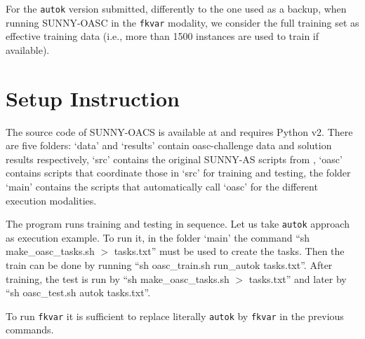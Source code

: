 \documentclass[tablecaption=bottom,wcp]{jmlr} %
\begin{document}
For the \texttt{autok} version submitted, differently to the one used as a 
backup, when running SUNNY-OASC in the \texttt{fkvar} modality, we consider the 
full training set as effective training data (i.e., more than 1500 
instances are used to train if available). 

\section{Setup Instruction}

The source code of SUNNY-OACS is available at \cite{sunnyoasc} and requires 
Python v2. There are five folders: `data' and `results' contain oasc-challenge 
data and solution results respectively, `src' contains the original SUNNY-AS 
scripts from \cite{sunnyas}, `oasc' contains scripts that coordinate those in 
`src' for training and testing, the folder `main' contains the scripts that 
automatically call `oasc' for the different execution modalities. 

The program runs training and testing in sequence. Let us take \texttt{autok} 
approach as execution example. To run it, in the folder `main' the 
command ``sh make\_oasc\_tasks.sh $>$ tasks.txt'' must be used to create 
the tasks. Then the train can be done by running ``sh oasc\_train.sh 
run\_autok tasks.txt''. After training, the test is run by ``sh 
make\_oasc\_tasks.sh $>$ tasks.txt'' and later by ``sh oasc\_test.sh autok 
tasks.txt''.

To run \texttt{fkvar} it is sufficient to replace 
literally \texttt{autok} by \texttt{fkvar} in the previous commands. 



\end{document}
